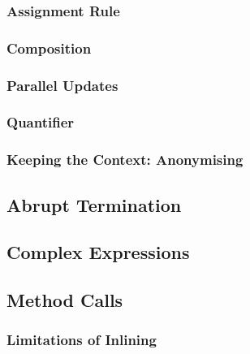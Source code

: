 \documentclass[a4paper, 11pt, accentcolor = tud3b]{tudreport}
\begin{document}
                \subsubsection{Assignment Rule} %

                \subsubsection{Composition} %

                \subsubsection{Parallel Updates} %

                \subsubsection{Quantifier} %

                \subsubsection{Keeping the Context: Anonymising} %

            \subsection{Abrupt Termination} %

            \subsection{Complex Expressions} %

            \subsection{Method Calls} %

                \subsubsection{Limitations of Inlining} %
\end{document}
